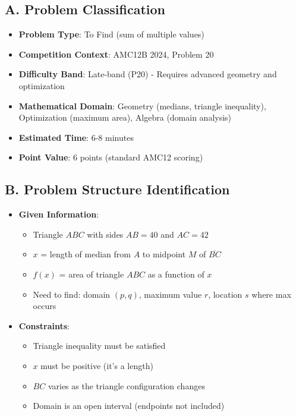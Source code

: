 \documentclass[12pt]{article}
\begin{document}
\begin{problemconfigbox}
\subsection*{A. Problem Classification}
\begin{itemize}[leftmargin=*]
    \item \textbf{Problem Type}: To Find (sum of multiple values)
    \item \textbf{Competition Context}: AMC12B 2024, Problem 20
    \item \textbf{Difficulty Band}: Late-band (P20) - Requires advanced geometry and optimization
    \item \textbf{Mathematical Domain}: Geometry (medians, triangle inequality), Optimization (maximum area), Algebra (domain analysis)
    \item \textbf{Estimated Time}: 6-8 minutes
    \item \textbf{Point Value}: 6 points (standard AMC12 scoring)
\end{itemize}

\subsection*{B. Problem Structure Identification}
\begin{itemize}[leftmargin=*]
    \item \textbf{Given Information}: 
    \begin{itemize}
        \item Triangle $ABC$ with sides $AB = 40$ and $AC = 42$
        \item $x$ = length of median from $A$ to midpoint $M$ of $\overline{BC}$
        \item $f(x)$ = area of triangle $ABC$ as a function of $x$
        \item Need to find: domain $(p,q)$, maximum value $r$, location $s$ where max occurs
    \end{itemize}
    
    \item \textbf{Constraints}: 
    \begin{itemize}
        \item Triangle inequality must be satisfied
        \item $x$ must be positive (it's a length)
        \item $BC$ varies as the triangle configuration changes
        \item Domain is an open interval (endpoints not included)
    \end{itemize}
    

\end{itemize}
\end{problemconfigbox}
\end{document}
